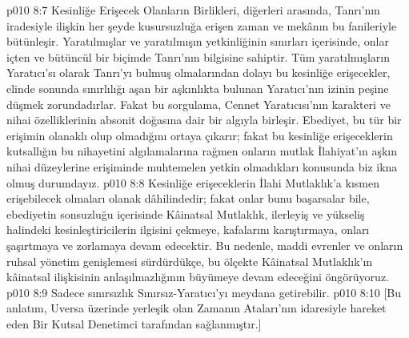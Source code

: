 \vs p010 8:7 Kesinliğe Erişecek Olanların Birlikleri, diğerleri arasında, Tanrı’nın iradesiyle ilişkin her şeyde kusursuzluğa erişen zaman ve mekânın bu fanileriyle bütünleşir. Yaratılmışlar ve yaratılmışın yetkinliğinin sınırları içerisinde, onlar içten ve bütüncül bir biçimde Tanrı’nın bilgisine sahiptir. Tüm yaratılmışların Yaratıcı’sı olarak Tanrı’yı bulmuş olmalarından dolayı bu kesinliğe erişecekler, elinde sonunda sınırlılığı aşan bir aşkınlıkta bulunan Yaratıcı’nın izinin peşine düşmek zorundadırlar. Fakat bu sorgulama, Cennet Yaratıcısı’nın karakteri ve nihai özelliklerinin absonit doğasına dair bir algıyla birleşir. Ebediyet, bu tür bir erişimin olanaklı olup olmadığını ortaya çıkarır; fakat bu kesinliğe erişeceklerin kutsallığın bu nihayetini algılamalarına rağmen onların mutlak İlahiyat’ın aşkın nihai düzeylerine erişiminde muhtemelen yetkin olmadıkları konusunda biz ikna olmuş durumdayız.
\vs p010 8:8 Kesinliğe erişeceklerin İlahi Mutlaklık’a kısmen erişebilecek olmaları olanak dâhilindedir; fakat onlar bunu başarsalar bile, ebediyetin sonsuzluğu içerisinde Kâinatsal Mutlaklık, ilerleyiş ve yükseliş halindeki kesinleştiricilerin ilgisini çekmeye, kafalarını karıştırmaya, onları şaşırtmaya ve zorlamaya devam edecektir. Bu nedenle, maddi evrenler ve onların ruhsal yönetim genişlemesi sürdürdükçe, bu ölçekte Kâinatsal Mutlaklık’ın kâinatsal ilişkisinin anlaşılmazlığının büyümeye devam edeceğini öngörüyoruz.
\vs p010 8:9 Sadece sınırsızlık Sınırsız\hyp{}Yaratıcı’yı meydana getirebilir.
\vs p010 8:10 [Bu anlatım, Uversa üzerinde yerleşik olan Zamanın Ataları’nın idaresiyle hareket eden Bir Kutsal Denetimci tarafından sağlanmıştır.]

